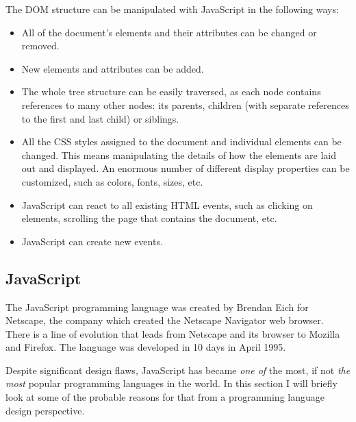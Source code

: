 The DOM structure can be manipulated with JavaScript in the following ways\cite{w3s_dom}:
\begin{itemize}
\item All of the document's elements and their attributes can be changed or removed.
\item New elements and attributes can be added.
\item The whole tree structure can be easily traversed, as each node contains references to many other nodes: its parents, children (with separate references to the first and last child) or siblings.
\item All the CSS styles assigned to the document and individual elements can be changed. This means manipulating the details of how the elements are laid out and displayed. An enormous number of different display properties can be customized\cite{mdn_css_ref}, such as colors, fonts, sizes, etc.
\item JavaScript can react to all existing HTML events, such as clicking on elements, scrolling the page that contains the document, etc.
\item JavaScript can create new events.
\end{itemize}

\subsection{JavaScript}
The JavaScript programming language was created by Brendan Eich for Netscape\cite[Introduction]{ecmascript}, the company which created the Netscape Navigator web browser. There is a line of evolution that leads from Netscape and its browser to Mozilla and Firefox\cite{netscape_mozilla, mozilla_story}. The language was developed in 10 days in April 1995\cite{js_ten_days}.

Despite significant design flaws, JavaScript has became \textit{one of} the most\cite{tiobe, pypl}, if not \textit{the most}\cite[Section~Most Popular Technologies per Dev Type]{so_developer_survey_2016}\cite{redmonk} popular programming languages in the world. In this section I will briefly look at some of the probable reasons for that from a programming language design perspective.

